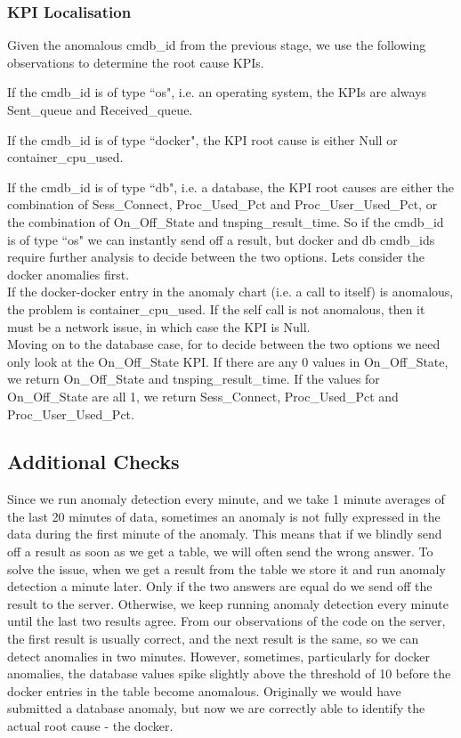 \documentclass[12pt]{article}
\let\tempone\itemize
\let\temptwo\enditemize
\renewenvironment{itemize}{\tempone\setlength{\itemsep}{0pt}}{\temptwo}
\begin{document}
\subsubsection{KPI Localisation}
Given the anomalous cmdb\_id from the previous stage, we use the following observations to determine the root cause KPIs. 
\begin{itemize}
    \item If the cmdb\_id is of type ``os", i.e. an operating system, the KPIs are always Sent\_queue and Received\_queue.
    \item If the cmdb\_id is of type ``docker", the KPI root cause is either Null or container\_cpu\_used.
    \item If the cmdb\_id is of type ``db", i.e. a database, the KPI root causes are either the combination of Sess\_Connect, Proc\_Used\_Pct and Proc\_User\_Used\_Pct, or the combination of On\_Off\_State and tnsping\_result\_time.
\end{itemize}
So if the cmdb\_id is of type ``os" we can instantly send off a result, but docker and db cmdb\_ids require further analysis to decide between the two options. Lets consider the docker anomalies first. \\
If the docker-docker entry in the anomaly chart (i.e. a call to itself) is anomalous, the problem is container\_cpu\_used. If the self call is not anomalous, then it must be a network issue, in which case the KPI is Null. \\
Moving on to the database case, for to decide between the two options we need only look at the On\_Off\_State KPI. If there are any 0 values in On\_Off\_State, we return On\_Off\_State and tnsping\_result\_time. If the values for On\_Off\_State are all 1, we return Sess\_Connect, Proc\_Used\_Pct and Proc\_User\_Used\_Pct.

\subsection{Additional Checks}
Since we run anomaly detection every minute, and we take 1 minute averages of the last 20 minutes of data, sometimes an anomaly is not fully expressed in the data during the first minute of the anomaly. This means that if we blindly send off a result as soon as we get a table, we will often send the wrong answer. To solve the issue, when we get a result from the table we store it and run anomaly detection a minute later. Only if the two answers are equal do we send off the result to the server. Otherwise, we keep running anomaly detection every minute until the last two results agree. From our observations of the code on the server, the first result is usually correct, and the next result is the same, so we can detect anomalies in two minutes. However, sometimes, particularly for docker anomalies, the database values spike slightly above the threshold of 10 before the docker entries in the table become anomalous. Originally we would have submitted a database anomaly, but now we are correctly able to identify the actual root cause - the docker.
\end{document}
